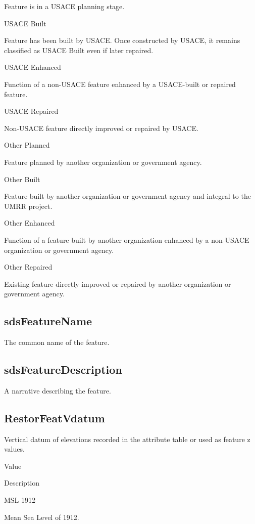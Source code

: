 \documentclass[
  letterpaper,
  DIV=11,
  numbers=noendperiod]{scrreprt}
\begin{document}
Feature is in a USACE planning stage.

USACE Built

Feature has been built by USACE. Once constructed by USACE, it remains
classified as USACE Built even if later repaired.

USACE Enhanced

Function of a non-USACE feature enhanced by a USACE-built or repaired
feature.

USACE Repaired

Non-USACE feature directly improved or repaired by USACE.

Other Planned

Feature planned by another organization or government agency.

Other Built

Feature built by another organization or government agency and integral
to the UMRR project.

Other Enhanced

Function of a feature built by another organization enhanced by a
non-USACE organization or government agency.

Other Repaired

Existing feature directly improved or repaired by another organization
or government agency.

\subsection{sdsFeatureName}\label{sdsfeaturename-12}

The common name of the feature.

\subsection{sdsFeatureDescription}\label{sdsfeaturedescription-12}

A narrative describing the feature.

\subsection{RestorFeatVdatum}\label{restorfeatvdatum-12}

Vertical datum of elevations recorded in the attribute table or used as
feature z values.

Value

Description

MSL 1912

Mean Sea Level of 1912.
\end{document}
